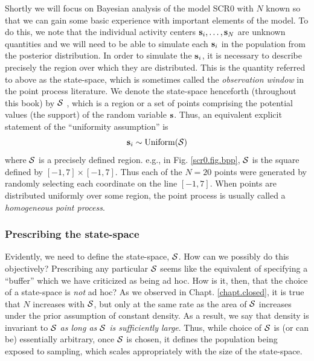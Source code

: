 Shortly we will focus on Bayesian analysis of the model SCR0 with $N$
known so that we can gain some basic experience with important
elements of the model.  To do this, we note that the individual
activity centers ${\bf s}_{i},\ldots, {\bf s}_{N}$ are unknown
quantities and we will need to be able to simulate each ${\bf s}_{i}$
in the population from the posterior distribution.  In order to
simulate the ${\bf s}_{i}$, it is necessary to describe precisely the
region over which they are distributed. This is the quantity referred
to above as the state-space, which is sometimes called the {\it
  observation window} in the point process literature. We denote the
state-space henceforth (throughout this book) by ${\cal S}$ , which is
a region or a set of points comprising the potential values (the
support) of the random variable ${\bf s}$. Thus, an equivalent
explicit statement of the ``uniformity assumption'' is
\[
{\bf s}_{i} \sim \mbox{Uniform}({\cal S})
\]
where ${\cal S}$ is a precisely defined region. e.g., in Fig.
\ref{scr0.fig.bpp}, ${\cal S}$ is the square defined by $[-1,7] \times
[-1, 7]$. Thus each of the $N=20$ points were generated by randomly
selecting each coordinate on the line $[-1, 7]$. When points are
distributed uniformly
over some region, the point process is usually called a {\it
  homogeneous point process}.



\subsubsection{Prescribing the state-space}
\label{scr0.sec.ss}

Evidently, we need to define the state-space, ${\cal S}$. How can we
possibly do this objectively? Prescribing any particular ${\cal S}$
seems like the equivalent of specifying a ``buffer'' which we
have criticized as being ad hoc. How is it, then, that the
choice of a state-space is {\it not} ad hoc?
As we observed in Chapt. \ref{chapt.closed}, it is true
that $N$ increases with ${\cal S}$, but only at the same rate as the
area of ${\cal S}$ increases under the prior assumption of constant
density. As a result, we say that density is invariant to ${\cal S}$
{\it as long as ${\cal S}$ is sufficiently large}. Thus, while choice of
${\cal S}$ is (or can be) essentially arbitrary, once ${\cal S}$ is
chosen, it defines the population being exposed to sampling, which
scales appropriately with the size of the state-space.

